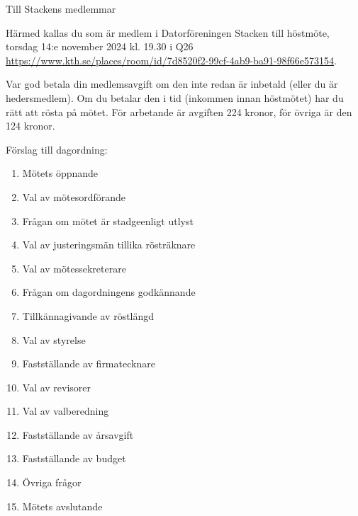 \documentclass[fontsize=11pt,enlargefirstpage,firstfoot=false,a4paper,pagenumber=no]{scrlttr2}
\begin{document}
 
\begin{letter}{Till Stackens medlemmar}

\opening{Härmed kallas du som är medlem i Datorföreningen Stacken till höstmöte, torsdag 14:e november 2024 kl. 19.30 i Q26\newline{}
\url{https://www.kth.se/places/room/id/7d8520f2-99cf-4ab9-ba91-98f66e573154}.}

Var god betala din medlemsavgift om den inte redan är inbetald (eller du är hedersmedlem). Om du betalar den i tid (inkommen innan höstmötet) 
har du rätt att rösta på mötet. För arbetande är avgiften 224 kronor, för övriga är den 124 kronor.

Förslag till dagordning:

\begin{enumerate}
	\itemsep0em
	\item  Mötets öppnande
	\item  Val av mötesordförande
	\item  Frågan om mötet är stadgeenligt utlyst
	\item  Val av justeringsmän tillika rösträknare
	\item  Val av mötessekreterare
	\item  Frågan om dagordningens godkännande
	\item  Tillkännagivande av röstlängd
	\item  Val av styrelse
	\item  Fastställande av firmatecknare
	\item  Val av revisorer
	\item  Val av valberedning
	\item  Fastställande av årsavgift
	\item  Fastställande av budget
	\item  Övriga frågor
	\item  Mötets avslutande
\end{enumerate}

\closing{}

\end{letter}
\end{document}
